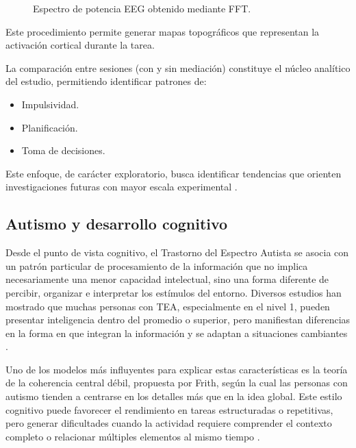 \documentclass{book}
\begin{document}
\begin{figure}[H]
\centering
{}
\caption{Espectro de potencia EEG obtenido mediante FFT.}
\label{fig:fft_eeg}
\end{figure}

Este procedimiento permite generar mapas topográficos que representan la activación cortical durante la tarea.

La comparación entre sesiones (con y sin mediación) constituye el núcleo analítico del estudio, permitiendo identificar patrones de:

\begin{itemize}
    \item Impulsividad.
    \item Planificación.
    \item Toma de decisiones.
\end{itemize}

Este enfoque, de carácter exploratorio, busca identificar tendencias que orienten investigaciones futuras con mayor escala experimental \cite{Luck2014, Klimesch1999, Delorme2004}.



\subsection{Autismo y desarrollo cognitivo}

Desde el punto de vista cognitivo, el Trastorno del Espectro Autista se asocia con un patrón particular de procesamiento de la información que no implica necesariamente una menor capacidad intelectual, sino una forma diferente de percibir, organizar e interpretar los estímulos del entorno. Diversos estudios han mostrado que muchas personas con TEA, especialmente en el nivel 1, pueden presentar inteligencia dentro del promedio o superior, pero manifiestan diferencias en la forma en que integran la información y se adaptan a situaciones cambiantes \cite{Frith2003, Happe2020, Hill2004}.

Uno de los modelos más influyentes para explicar estas características es la teoría de la coherencia central débil, propuesta por Frith, según la cual las personas con autismo tienden a centrarse en los detalles más que en la idea global. Este estilo cognitivo puede favorecer el rendimiento en tareas estructuradas o repetitivas, pero generar dificultades cuando la actividad requiere comprender el contexto completo o relacionar múltiples elementos al mismo tiempo \cite{Frith2003, Happe2006}.
\end{document}
